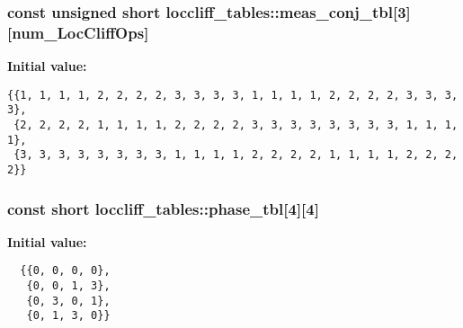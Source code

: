 \subsubsection{\setlength{\rightskip}{0pt plus 5cm}const unsigned short loccliff\_\-tables::meas\_\-conj\_\-tbl[3][{\bf num\_\-Loc\-Cliff\-Ops}]}\label{namespaceloccliff__tables_a0}


{\bf Initial value:}

\footnotesize\begin{verbatim} 
{{1, 1, 1, 1, 2, 2, 2, 2, 3, 3, 3, 3, 1, 1, 1, 1, 2, 2, 2, 2, 3, 3, 3, 3}, 
 {2, 2, 2, 2, 1, 1, 1, 1, 2, 2, 2, 2, 3, 3, 3, 3, 3, 3, 3, 3, 1, 1, 1, 1}, 
 {3, 3, 3, 3, 3, 3, 3, 3, 1, 1, 1, 1, 2, 2, 2, 2, 1, 1, 1, 1, 2, 2, 2, 2}}
\end{verbatim}\normalsize 
{}
\subsubsection{\setlength{\rightskip}{0pt plus 5cm}const short loccliff\_\-tables::phase\_\-tbl[4][4]}\label{namespaceloccliff__tables_a3}


{\bf Initial value:}

\footnotesize\begin{verbatim}
  {{0, 0, 0, 0},
   {0, 0, 1, 3},
   {0, 3, 0, 1},
   {0, 1, 3, 0}}
\end{verbatim}\normalsize 
